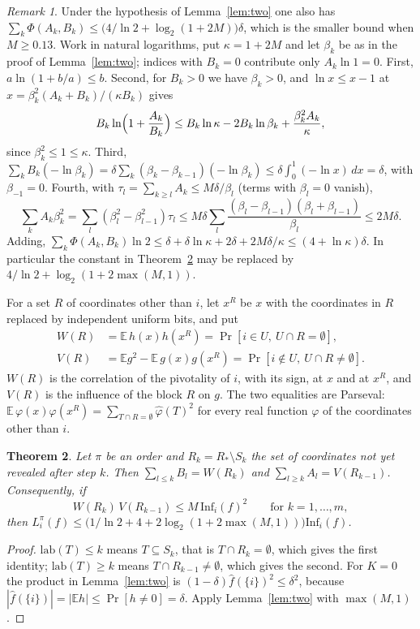 \documentclass[11pt]{amsart}
\newtheorem{theorem}{Theorem}
\theoremstyle{remark}
\newtheorem{remark}[theorem]{Remark}
\newcommand{\Inf}{\mathrm{Inf}}
\newcommand{\E}{\mathbb{E}}
\newcommand{\lab}{\mathrm{lab}}
\begin{document}
\begin{remark}\label{rem:two}
Under the hypothesis of Lemma~\ref{lem:two} one also has $\sum_k\Phi(A_k,B_k)\le\bigl(4/\ln2+\log_2(1+2M)\bigr)\delta$,
which is the smaller bound when $M\ge0.13$. Work in natural logarithms, put $\kappa=1+2M$ and let $\beta_k$ be as in
the proof of Lemma~\ref{lem:two}; indices with $B_k=0$ contribute only $A_k\ln1=0$. First,
$a\ln(1+b/a)\le b$. Second, for $B_k>0$ we have $\beta_k>0$, and $\ln x\le x-1$ at $x=\beta_k^2(A_k+B_k)/(\kappa B_k)$ gives
\[
B_k\ln\Bigl(1+\frac{A_k}{B_k}\Bigr)\le B_k\ln\kappa-2B_k\ln\beta_k+\frac{\beta_k^2A_k}\kappa,
\]
since $\beta_k^2\le1\le\kappa$. Third, $\sum_kB_k(-\ln\beta_k)=\delta\sum_k(\beta_k-\beta_{k-1})(-\ln\beta_k)\le
\delta\int_0^1(-\ln x)\,dx=\delta$, with $\beta_{-1}=0$. Fourth, with $\tau_l=\sum_{k\ge l}A_k\le M\delta/\beta_l$ (terms with $\beta_l=0$ vanish),
\[
\sum_kA_k\beta_k^2=\sum_l(\beta_l^2-\beta_{l-1}^2)\tau_l\le M\delta\sum_l\frac{(\beta_l-\beta_{l-1})(\beta_l+\beta_{l-1})}{\beta_l}
\le2M\delta.
\]
Adding, $\sum_k\Phi(A_k,B_k)\ln2\le\delta+\delta\ln\kappa+2\delta+2M\delta/\kappa\le(4+\ln\kappa)\delta$. In particular the constant
in Theorem~\ref{thm:suff} may be replaced by $4/\ln2+\log_2(1+2\max(M,1))$.
\end{remark}

For a set $R$ of coordinates other than $i$, let $x^R$ be $x$ with the coordinates in $R$ replaced by independent
uniform bits, and put
\begin{align*}
W(R)&=\E\,h(x)h(x^R)=\Pr[i\in U,\ U\cap R=\emptyset],\\
V(R)&=\E g^2-\E\,g(x)g(x^R)=\Pr[i\notin U,\ U\cap R\neq\emptyset].
\end{align*}
$W(R)$ is the correlation of the pivotality of $i$, with its sign, at $x$ and at $x^R$, and $V(R)$ is the influence of the block
$R$ on $g$. The two equalities are Parseval: $\E\,\varphi(x)\varphi(x^R)=\sum_{T\cap R=\emptyset}\hat\varphi(T)^2$ for every real function $\varphi$ of the coordinates other than $i$.

\begin{theorem}\label{thm:suff}
Let $\pi$ be an order and $R_k=R_*\setminus S_k$ the set of coordinates not yet revealed after step $k$. Then
$\sum_{l\le k}B_l=W(R_k)$ and $\sum_{l\ge k}A_l=V(R_{k-1})$. Consequently, if
\[
W(R_k)\,V(R_{k-1})\le M\,\Inf_i(f)^2\qquad\text{for }k=1,\dots,m,
\]
then $L^\pi_i(f)\le\bigl(1/\ln2+4+2\log_2(1+2\max(M,1))\bigr)\Inf_i(f)$.
\end{theorem}

\begin{proof}
$\lab(T)\le k$ means $T\subseteq S_k$, that is $T\cap R_k=\emptyset$, which gives the first identity; $\lab(T)\ge k$ means
$T\cap R_{k-1}\ne\emptyset$, which gives the second. For $K=0$ the product in Lemma~\ref{lem:two} is
$(1-\delta)\hat f(\{i\})^2\le\delta^2$, because $|\hat f(\{i\})|=|\E h|\le\Pr[h\ne0]=\delta$. Apply Lemma~\ref{lem:two}
with $\max(M,1)$.
\end{proof}
\end{document}
